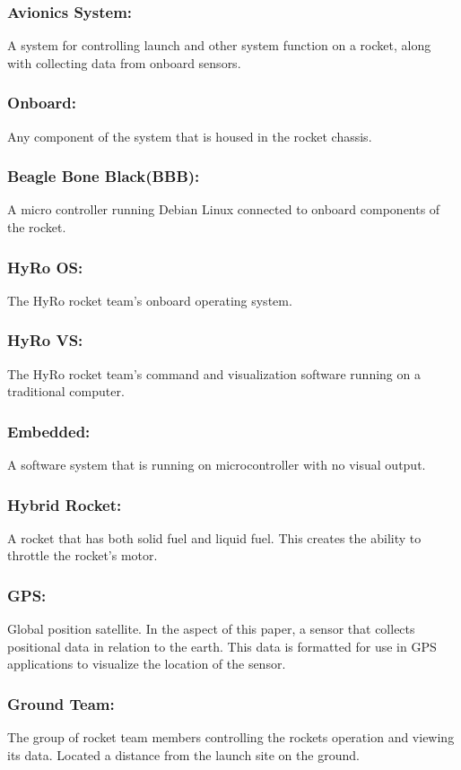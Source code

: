 \documentclass[10pt,draftclsnofoot,onecolumn,compsoc]{IEEEtran}
\begin{document}
\subsubsection{\bf Avionics System:}  A system for controlling launch and other system function on a rocket, along with collecting data from onboard sensors.
\subsubsection{\bf Onboard:} Any component of the system that is housed in the rocket chassis.
\subsubsection{\bf Beagle Bone Black(BBB):}   A micro controller running Debian Linux connected to onboard components of the rocket.
\subsubsection{\bf HyRo OS:}  The HyRo rocket team's onboard operating system.
\subsubsection{\bf HyRo VS:} The HyRo rocket team's command and visualization software running on a traditional computer.
\subsubsection{\bf Embedded:} A software system that is running on microcontroller with no visual output.
\subsubsection{\bf Hybrid Rocket:} A rocket that has both solid fuel and liquid fuel. This creates the ability to throttle the rocket's motor.
\subsubsection{\bf GPS:} Global position satellite. In the aspect of this paper, a sensor that collects positional data in relation to the earth. This data is formatted for use in GPS applications to visualize the location of the sensor.
\subsubsection{\bf Ground Team:} The group of rocket team members controlling the rockets operation and viewing its data. Located a distance from the launch site on the ground.
\end{document}
